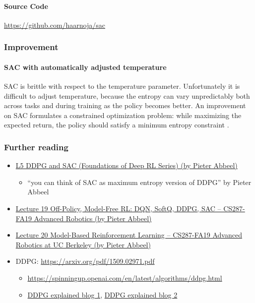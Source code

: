 \documentclass[lang=en,mode=normal,device=normal,color=blue,12pt]{elegantnote}
\DeclareMathOperator*{\1}{\mathbbm{1}}
\begin{document}
\paragraph{Source Code}
\url{https://github.com/haarnoja/sac}

\subsubsection{Improvement}

\paragraph{SAC with automatically adjusted temperature}

SAC is brittle with respect to the temperature parameter.
Unfortunately it is difficult to adjust temperature, because the entropy can vary unpredictably both across tasks and during training as the policy becomes better.
An improvement on SAC formulates a constrained optimization problem: while maximizing the expected return, the policy should satisfy a minimum entropy constraint \cite{haarnoja2019soft}.


\subsubsection{Further reading}
%
\begin{itemize}
\item \href{https://www.youtube.com/watch?v=pg-lKy7JIRk}{L5 DDPG and SAC (Foundations of Deep RL Series) (by Pieter Abbeel)}
\begin{itemize}
\item ``you can think of SAC as maximum entropy version of DDPG'' by Pieter Abbeel
\end{itemize}
\item \href{https://www.youtube.com/watch?v=QASqaj_HUZw}{Lecture 19 Off-Policy, Model-Free RL: DQN, SoftQ, DDPG, SAC -- CS287-FA19 Advanced Robotics (by Pieter Abbeel)}
\item \href{https://www.youtube.com/watch?v=Y2XBiUtZo1k}{Lecture 20 Model-Based Reinforcement Learning -- CS287-FA19 Advanced Robotics at UC Berkeley (by Pieter Abbeel)}
\item DDPG: \url{https://arxiv.org/pdf/1509.02971.pdf}
\begin{itemize}
\item \url{https://spinningup.openai.com/en/latest/algorithms/ddpg.html}
\item \href{https://towardsdatascience.com/deep-deterministic-policy-gradient-ddpg-theory-and-implementation-747a3010e82f}{DDPG explained blog 1}, \href{https://lilianweng.github.io/lil-log/2018/04/08/policy-gradient-algorithms.html#ddpg}{DDPG explained blog 2}
\end{itemize}
\end{itemize}
\end{document}
